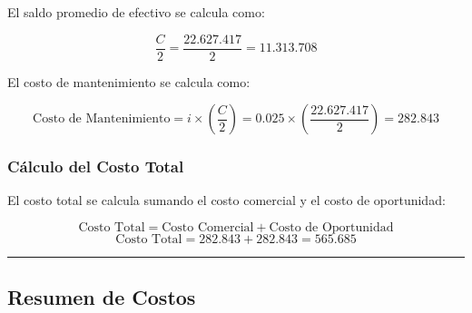 \documentclass[
  letterpaper,
  DIV=11,
  numbers=noendperiod]{scrartcl}
\begin{document}
El saldo promedio de efectivo se calcula como:

\[
\frac{C}{2} = \frac{22.627.417}{2} = 11.313.708
\]

El costo de mantenimiento se calcula como:

\[
\text{Costo de Mantenimiento} = i \times \left(\frac{C}{2}\right) = 0.025 \times \left(\frac{22.627.417}{2}\right) = 282.843
\]

\subsubsection{Cálculo del Costo
Total}\label{cuxe1lculo-del-costo-total}

El costo total se calcula sumando el costo comercial y el costo de
oportunidad:

\[
\text{Costo Total} = \text{Costo Comercial} + \text{Costo de Oportunidad} 
\] \[
\text{Costo Total} = 282.843 + 282.843 = 565.685
\]

\begin{center}\rule{0.5\linewidth}{0.5pt}\end{center}

\subsection{Resumen de Costos}\label{resumen-de-costos}
\end{document}
